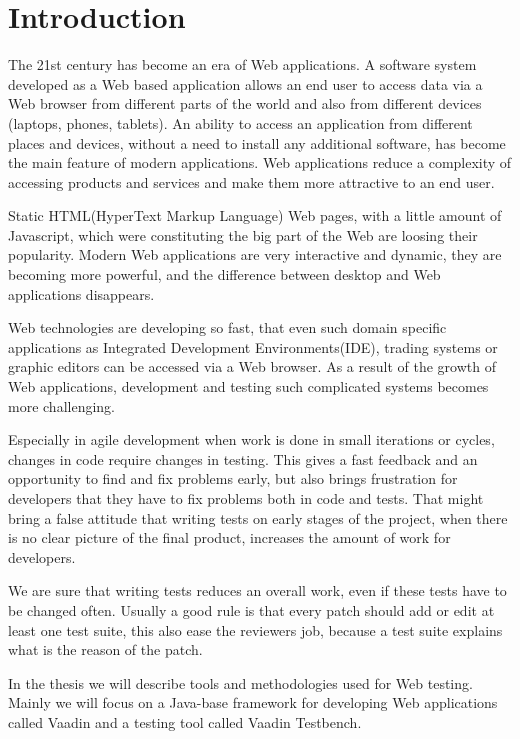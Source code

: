 	
	 \chapter{Introduction}
	 \label{ch:intro} 		
	The 21st century has become an era of Web applications. A software system
	developed as a Web based application allows an end user to access data via
	a Web browser from different parts of the world and also from different devices
	(laptops, phones, tablets). An ability to access an application from different
	places and devices, without a need to install any additional software,
	has become the main feature of modern applications. Web applications reduce a
	complexity of accessing products and services and make them more attractive to an end
	user.
	
	Static HTML(HyperText Markup Language) Web pages, with a little amount of
	Javascript, which were constituting the big part of the Web are loosing their popularity.
	Modern Web	applications are very interactive and dynamic, they are becoming
	more powerful, and the difference between desktop and Web applications
	disappears. 
	
	Web technologies are developing so fast, that even such domain
	specific applications as Integrated Development Environments(IDE), trading
	systems or graphic editors can be accessed via a Web browser. As a result of
	the growth of Web applications, development and testing such complicated
	systems becomes more challenging.
	
	Especially in agile development when work is done in small iterations or
	cycles, changes in code require changes in testing. This gives a fast feedback and
    an opportunity to find and fix problems early, but also brings frustration
    for developers that they have to fix problems both in code and tests. 
	That might bring a false attitude that writing tests on early stages of the project,
	 when there is no clear picture of the final product,
	 increases the amount of work for developers. 
 
	 We are sure that writing tests reduces an overall work,
	 even if these tests have to be changed often. Usually a good rule is that
	 every patch should add or edit at least one test suite, this also ease the
	 reviewers job, because a test suite explains what is the reason of the patch.
	
	In the thesis we will describe tools and methodologies used for Web testing.
	Mainly we will focus on a Java-base framework for developing Web applications
	called Vaadin and a testing tool called Vaadin Testbench.
	
